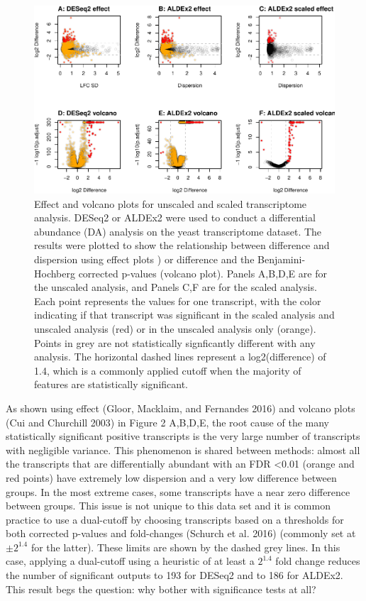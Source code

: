 \documentclass[
]{article}
\begin{document}
\begin{figure}
\centering
\includegraphics{go3_files/figure-latex/plot1-1.pdf}
\caption{Effect and volcano plots for unscaled and scaled transcriptome
analysis. DESeq2 or ALDEx2 were used to conduct a differential abundance
(DA) analysis on the yeast transcriptome dataset. The results were
plotted to show the relationship between difference and dispersion using
effect plots ) or difference and the Benjamini-Hochberg corrected
p-values (volcano plot). Panels A,B,D,E are for the unscaled analysis,
and Panels C,F are for the scaled analysis. Each point represents the
values for one transcript, with the color indicating if that transcript
was significant in the scaled analysis and unscaled analysis (red) or in
the unscaled analysis only (orange). Points in grey are not
statistically signficantly different with any analysis. The horizontal
dashed lines represent a log2(difference) of 1.4, which is a commonly
applied cutoff when the majority of features are statistically
significant.}
\end{figure}

As shown using effect (Gloor, Macklaim, and Fernandes 2016) and volcano
plots (Cui and Churchill 2003) in Figure 2 A,B,D,E, the root cause of
the many statistically significant positive transcripts is the very
large number of transcripts with negligible variance. This phenomenon is
shared between methods: almost all the transcripts that are
differentially abundant with an FDR \textless 0.01 (orange and red
points) have extremely low dispersion and a very low difference between
groups. In the most extreme cases, some transcripts have a near zero
difference between groups. This issue is not unique to this data set and
it is common practice to use a dual-cutoff by choosing transcripts based
on a thresholds for both corrected p-values and fold-changes (Schurch et
al. 2016) (commonly set at \(\pm 2^{1.4}\) for the latter). These limits
are shown by the dashed grey lines. In this case, applying a dual-cutoff
using a heuristic of at least a \(2^{1.4}\) fold change reduces the
number of significant outputs to 193 for DESeq2 and to 186 for ALDEx2.
This result begs the question: why bother with significance tests at
all?
\end{document}
